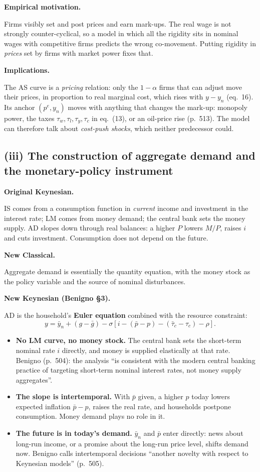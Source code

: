 \documentclass[11pt, a4paper]{article}
\newcommand{\passo}[1]{\medskip\noindent\textbf{#1}\par\nobreak}
\newcommand{\ybn}{\bar y_n}
\newcommand{\pbar}{\bar p}
\begin{document}
\passo{Empirical motivation.}
Firms visibly set and post prices and earn mark-ups. The real wage is not strongly
counter-cyclical, so a model in which all the rigidity sits in nominal wages with
competitive firms predicts the wrong co-movement. Putting rigidity in \emph{prices} set by
firms with market power fixes that.

\passo{Implications.}
The AS curve is a \emph{pricing} relation: only the $1-\alpha$ firms that can adjust move
their prices, in proportion to real marginal cost, which rises with $y-y_n$ (eq.\ 16). Its
anchor $(p^e,y_n)$ moves with anything that changes the mark-up: monopoly power, the taxes
$\tau_w,\tau_l,\tau_y,\tau_c$ in eq.\ (13), or an oil-price rise (p.~513). The model can
therefore talk about \emph{cost-push shocks}, which neither predecessor could.

\subsection*{(iii) The construction of aggregate demand and the monetary-policy instrument}

\passo{Original Keynesian.}
IS comes from a consumption function in \emph{current} income and investment in the
interest rate; LM comes from money demand; the central bank sets the money supply. AD slopes
down through real balances: a higher $P$ lowers $M/P$, raises $i$ and cuts investment.
Consumption does not depend on the future.

\passo{New Classical.}
Aggregate demand is essentially the quantity equation, with the money stock as the policy
variable and the source of nominal disturbances.

\passo{New Keynesian (Benigno \S3).}
AD is the household's \textbf{Euler equation} combined with the resource constraint:
\[
y=\ybn+(g-\bar g)-\sigma\left[i-(\pbar-p)-(\bar\tau_c-\tau_c)-\rho\right].
\]
\begin{itemize}
\item \textbf{No LM curve, no money stock.} The central bank sets the short-term nominal
      rate $i$ directly, and money is supplied elastically at that rate. Benigno (p.~504):
      the analysis ``is consistent with the modern central banking practice of targeting
      short-term nominal interest rates, not money supply aggregates''.
\item \textbf{The slope is intertemporal.} With $\pbar$ given, a higher $p$ today lowers
      expected inflation $\pbar-p$, raises the real rate, and households postpone
      consumption. Money demand plays no role in it.
\item \textbf{The future is in today's demand.} $\ybn$ and $\pbar$ enter directly: news
      about long-run income, or a promise about the long-run price level, shifts demand now.
      Benigno calls intertemporal decisions ``another novelty with respect to Keynesian
      models'' (p.~505).
\end{itemize}
\end{document}

